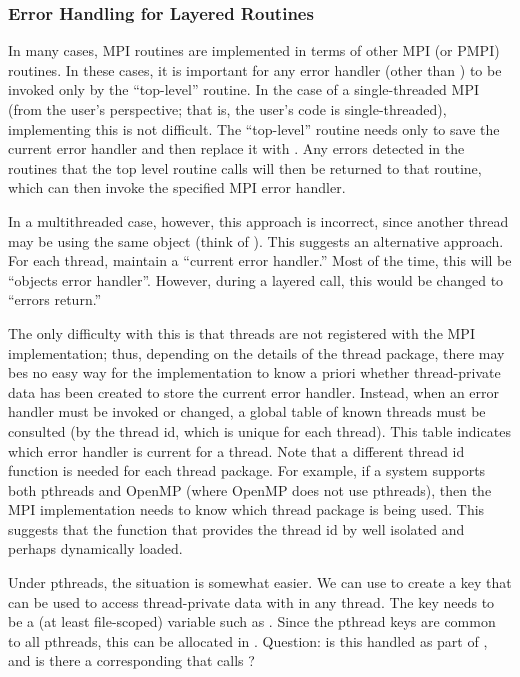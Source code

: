 \documentclass{article}
\begin{document}
\subsubsection{Error Handling for Layered Routines}
\label{sec:err-handling-nested}
In many cases, MPI routines are implemented in terms of other MPI (or
PMPI) routines.  In these cases, it is important for any error handler
(other than ) to be invoked only by the
``top-level'' routine.  In the case of a single-threaded MPI (from the
user's perspective; that is, the user's code is single-threaded),
implementing this is not difficult.  The ``top-level'' routine needs
only to save the current error handler and then replace it with
.  Any errors detected in the routines
that the top level routine calls will then be returned to that
routine, which can then invoke the specified MPI error handler.

In a multithreaded case, however, this approach is incorrect, since
another thread may be using the same object (think of
).  This suggests an alternative approach.
For each thread, maintain a ``current error handler.''  Most of the
time, this will be ``objects error handler''.  However, during a
layered call, this would be changed to ``errors return.''  

The only difficulty with this is that threads are not registered with
the MPI implementation; thus, depending on the details of the thread package,
there may bes no easy way for the implementation
to know a priori whether thread-private data has been created to store
the current error handler.  Instead, when an error handler must be
invoked or changed, a global table of known threads must be consulted
(by the thread id, which is unique for each thread).  This table
indicates which error handler is current for a thread.  
Note that a different thread id function is needed for each thread
package.  For example, if a system supports both pthreads and OpenMP
(where OpenMP does not use pthreads), then the MPI implementation
needs to know which thread package is being used.  This suggests that
the function that provides the thread id by well isolated and perhaps
dynamically loaded.

Under pthreads, the situation is somewhat easier.  We can use
 to create a key that can be used to access
thread-private data with  in any thread.
The key needs to be a (at least file-scoped) variable such as
. 
Since the pthread keys are common to all pthreads, this can be allocated in
.  Question: is this handled as part of
, and is there a corresponding
 that calls ?
\end{document}
